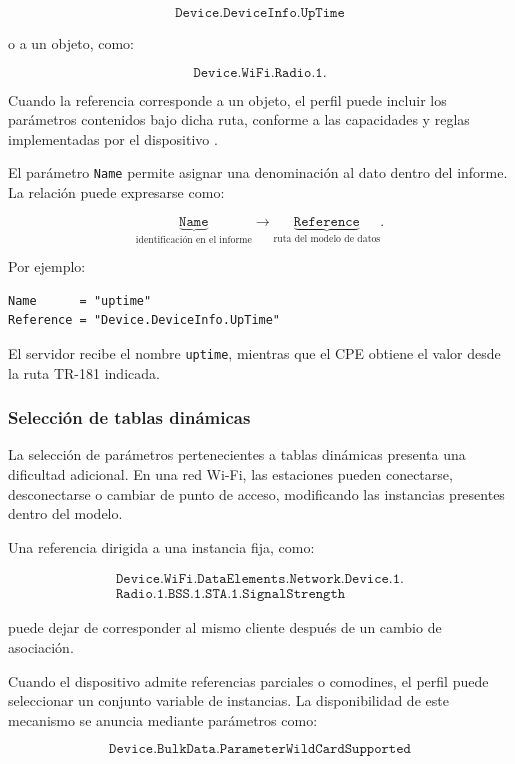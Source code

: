\[
    \texttt{Device.DeviceInfo.UpTime}
\]

o a un objeto, como:

\[
    \texttt{Device.WiFi.Radio.1.}
\]

Cuando la referencia corresponde a un objeto, el perfil puede incluir los
parámetros contenidos bajo dicha ruta, conforme a las capacidades y
reglas implementadas por el dispositivo \cite{bbf_tr181}.

El parámetro \texttt{Name} permite asignar una denominación al dato dentro
del informe. La relación puede expresarse como:

\[
    \underbrace{\texttt{Name}}_{\text{identificación en el informe}}
    \longrightarrow
    \underbrace{\texttt{Reference}}_{\text{ruta del modelo de datos}}.
\]

Por ejemplo:

\begin{verbatim}
Name      = "uptime"
Reference = "Device.DeviceInfo.UpTime"
\end{verbatim}

El servidor recibe el nombre \texttt{uptime}, mientras que el CPE obtiene
el valor desde la ruta TR-181 indicada.


\subsubsection*{Selección de tablas dinámicas}

La selección de parámetros pertenecientes a tablas dinámicas presenta una
dificultad adicional. En una red Wi-Fi, las estaciones pueden conectarse,
desconectarse o cambiar de punto de acceso, modificando las instancias
presentes dentro del modelo.

Una referencia dirigida a una instancia fija, como:

\[
\begin{split}
    \texttt{Device.WiFi.DataElements.Network.Device.1.}\\
    \texttt{Radio.1.BSS.1.STA.1.SignalStrength}
\end{split}
\]

puede dejar de corresponder al mismo cliente después de un cambio de
asociación.

Cuando el dispositivo admite referencias parciales o comodines, el
perfil puede seleccionar un conjunto variable de instancias. La
disponibilidad de este mecanismo se anuncia mediante parámetros como:

\[
    \texttt{Device.BulkData.ParameterWildCardSupported}
\]

